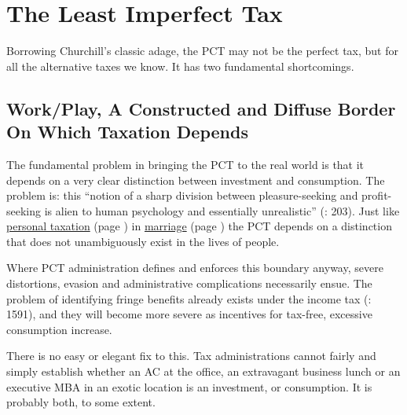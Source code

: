 \section{The Least Imperfect Tax} \label{sec:LeastImperfect} Borrowing Churchill's classic adage, the PCT may not be the perfect tax, but for all the alternative taxes we know. It has two fundamental shortcomings.

\subsection[Work/Play]{Work/Play, A Constructed and Diffuse Border On Which Taxation Depends} \label{sec:WorkPlay} The fundamental problem in bringing the PCT to the real world is that it depends on a very clear distinction between investment and consumption. The problem is: this ``notion of a sharp division between pleasure-seeking and profit-seeking is alien to human psychology and essentially unrealistic'' (\citealt{Bittker1973}: 203). Just like \hyperref[des:PersonalTaxation]{personal taxation} (page \pageref{des:PersonalTaxation}) in \hyperref[sec:LoveMarriage]{marriage} (page \pageref{sec:LoveMarriage}) the PCT depends on a distinction that does not unambiguously exist in the lives of people.


Where PCT administration defines and enforces this boundary anyway, severe distortions, evasion and administrative complications necessarily ensue. The problem of identifying fringe benefits already exists under the income tax (\citealt{Graetz2009}: 1591), and they will become more severe as incentives for tax-free, excessive consumption increase.

There is no easy or elegant fix to this. Tax administrations cannot fairly and simply establish whether an AC at the office, an extravagant business lunch or an executive MBA in an exotic location is an investment, or consumption. It is probably both, to some extent.

